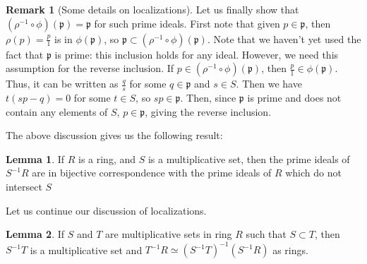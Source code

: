 \documentclass[aps,pra,showpacs,notitlepage,onecolumn,superscriptaddress,nofootinbib]{revtex4-1}
\theoremstyle{definition}
\newtheorem{lemma}{Lemma}[section]
\newtheorem{remark}{Remark}[section]
\begin{document}
\begin{remark}[Some details on localizations]
  Let us finally show that $(\rho^{-1} \circ \phi)(\mathfrak{p}) = \mathfrak{p}$ for such prime ideals. First note that given $p \in \mathfrak{p}$, then $\rho(p) = \frac{p}{1}$ is in $\phi(\mathfrak{p})$, so
  $\mathfrak{p} \subset (\rho^{-1} \circ \phi)(\mathfrak{p})$. Note that we haven't yet used the fact that $\mathfrak{p}$ is prime: this inclusion holds for any ideal. However, we need this assumption for the reverse inclusion.
  If $p \in (\rho^{-1} \circ \phi)(\mathfrak{p})$, then $\frac{p}{1} \in \phi(\mathfrak{p})$. Thus, it can be written as $\frac{q}{s}$ for some $q \in \mathfrak{p}$ and $s \in S$. Then we have
  $t (sp - q) = 0$ for some $t \in S$, so $sp \in \mathfrak{p}$. Then, since $\mathfrak{p}$ is prime and does not contain any elements of $S$, $p \in \mathfrak{p}$, giving the reverse inclusion.
  \end{remark}

\noindent The above discussion gives us the following result:

\begin{lemma}
  \label{lem:s}
  If $R$ is a ring, and $S$ is a multiplicative set, then the prime ideals of $S^{-1} R$ are in bijective correspondence with the prime ideals of $R$ which do not intersect $S$
  \end{lemma}

\noindent Let us continue our discussion of localizations.

\begin{lemma}
  \label{lem:s2}
  If $S$ and $T$ are multiplicative sets in ring $R$ such that $S \subset T$, then $S^{-1} T$ is a multiplicative set and $T^{-1} R \simeq (S^{-1} T)^{-1} (S^{-1} R)$ as rings.
  \end{lemma}
\end{document}
